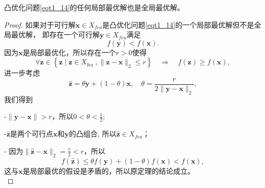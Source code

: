 \begin{theorem}
    凸优化问题\ref{eqt1_14}的任何局部最优解也是全局最优解。
    \label{the1_4}
\end{theorem}
\begin{proof}
    如果对于可行解$  \bm{x} \in X_{f e a} $是凸优化问题\ref{eqt1_14}的一个局部最优解但不是全局最优解， 即存在一个可行解$  \bm{y} \in X_{f e a}  $满足
    \begin{equation}
    f(\bm{y})<f(\bm{x}) .
        \nonumber
    \end{equation}
因为$\bm{x}$是局部最优化，所以存在一个$  r>0  $使得
    \begin{equation}
    \forall \bm{z} \in\left\{\bm{z} \mid \bm{z} \in X_{\text {fea }},\|\bm{z}-\bm{x}\|_{2} \leq r\right\} \quad \Rightarrow \quad f(\bm{z}) \geq f(\bm{x}),
        \nonumber
    \end{equation}
进一步考虑
\begin{equation}
\hat{\bm{z}}=\theta \bm{y}+(1-\theta) \bm{x}, \quad \theta=\frac{r}{2\|\bm{y}-\bm{x}\|_{2}} ,
    \nonumber
\end{equation}
我们得到
\par -$  \|\bm{y}-\bm{x}\|>r $，所以$  0<\theta<\frac{1}{2} $;
\par -$  \hat{\bm{z}}  $是两个可行点$\bm{x}$和$\bm{y}$的凸组合, 所以$  \hat{\bm{z}} \in X_{f e a} $；
\par - 因为$  \|\hat{\bm{z}}-\bm{x}\|_{2}=\frac{r}{2}<r $，所以
\begin{equation}
f(\hat{\bm{z}}) \leq \theta f(\bm{y})+(1-\theta) f(\bm{x})<f(\bm{x}),
    \nonumber
\end{equation}
这与$\bm{x}$是局部最优的假设是矛盾的，所以原定理的结论成立。\\
\end{proof}